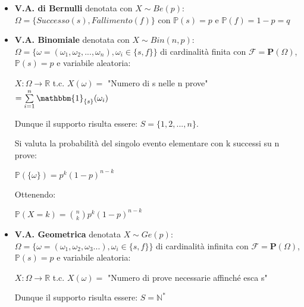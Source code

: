 \begin{itemize}
    \item \textbf{V.A. di Bernulli} denotata con $X\sim Be(p)$:
    \vspace{5px}
    \newline
    $\Omega=\{Successo(s),Fallimento(f)\}$ con $\mathbb{P}(s)=p$ e $\mathbb{P}(f)=1-p=q$
    \vspace{10px}
    \newline
    \item \textbf{V.A. Binomiale} denotata con $X\sim Bin(n,p)$:
    \vspace{5px}
    \newline
    $\Omega=\{\omega=(\omega_1,\omega_2,...,\omega_n) , \omega_i\in\{s,f\}\}$ di cardinalità finita con
    \newline
    $\mathscr{F}=\mathbf{P}(\Omega)$, $\mathbb{P}(s)=p$ e variabile aleatoria:
    \begin{center}
        $X:\Omega\longrightarrow\mathbb{R}$ t.c. $X(\omega)=$
        "Numero di s nelle n prove"
        $=\sum\limits_{i=1}^n\mathbbm{1}_{\{s\}}(\omega_i)$
    \end{center}
    Dunque il supporto risulta essere: $S=\{1,2,...,n\}$.
    

    
    Si valuta la probabilità del singolo evento elementare con k successi su n prove:
    \begin{center}
        $\mathbb{P}(\{\omega\})=p^k(1-p)^{n-k}$
    \end{center}
    Ottenendo:
    \begin{center}
        $\mathbb{P}(X=k)=\binom{n}{k}p^k(1-p)^{n-k}$
    \end{center}
    \vspace{10px}
    \item \textbf{V.A. Geometrica} denotata $X\sim Ge(p)$:
    \vspace{5px}
    \newline
    $\Omega=\{\omega=(\omega_1,\omega_2,\omega_3...) , \omega_i\in\{s,f\}\}$ di cardinalità infinita con
    \newline
    $\mathscr{F}=\mathbf{P}(\Omega)$, $\mathbb{P}(s)=p$ e variabile aleatoria:
    \begin{center}
        $X:\Omega\longrightarrow\mathbb{R}$ t.c. $X(\omega)=$
        "Numero di prove necessarie affinché esca s"
    \end{center}
    Dunque il supporto risulta essere: $S=\mathbb{N}^*$
    

\end{itemize}
